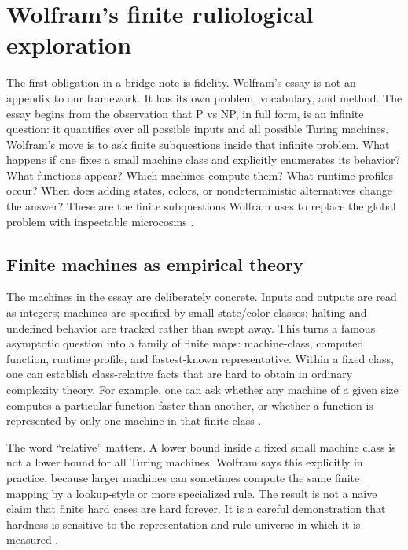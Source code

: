 \documentclass{pantarhei-researchnote}
\begin{document}
\section{Wolfram's finite ruliological exploration}
\label{sec:wolfram}

The first obligation in a bridge note is fidelity. Wolfram's essay is not
an appendix to our framework. It has its own problem, vocabulary, and
method. The essay begins from the observation that P vs NP, in full form,
is an infinite question: it quantifies over all possible inputs and all
possible Turing machines. Wolfram's move is to ask finite subquestions
inside that infinite problem. What happens if one fixes a small machine
class and explicitly enumerates its behavior? What functions appear? Which
machines compute them? What runtime profiles occur? When does adding
states, colors, or nondeterministic alternatives change the answer? These
are the finite subquestions Wolfram uses to replace the global problem
with inspectable microcosms \cite{Wolfram2026RuliologicalPNP}.

\subsection{Finite machines as empirical theory}

The machines in the essay are deliberately concrete. Inputs and outputs
are read as integers; machines are specified by small state/color classes;
halting and undefined behavior are tracked rather than swept away. This
turns a famous asymptotic question into a family of finite maps:
machine-class, computed function, runtime profile, and fastest-known
representative. Within a fixed class, one can establish class-relative
facts that are hard to obtain in ordinary complexity theory. For example,
one can ask whether any machine of a given size computes a particular
function faster than another, or whether a function is represented by only
one machine in that finite class \cite{Wolfram2026RuliologicalPNP}.

The word ``relative'' matters. A lower bound inside a fixed small machine
class is not a lower bound for all Turing machines. Wolfram says this
explicitly in practice, because larger machines can sometimes compute the
same finite mapping by a lookup-style or more specialized rule. The result
is not a naive claim that finite hard cases are hard forever. It is a
careful demonstration that hardness is sensitive to the representation and
rule universe in which it is measured \cite{Wolfram2026RuliologicalPNP}.
\end{document}
